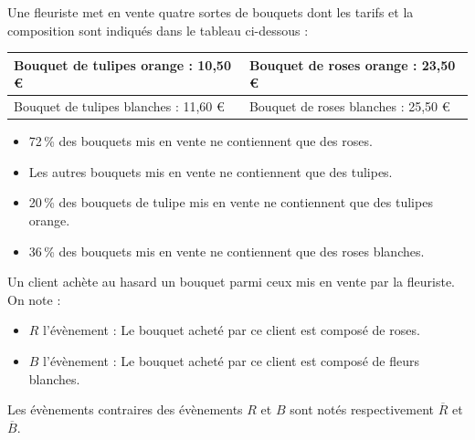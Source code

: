 \medskip

Une fleuriste met en vente quatre sortes de bouquets dont les tarifs et la composition sont
indiqués dans le tableau ci-dessous :

\medskip
\begin{center}
\begin{tabularx}{0.85\linewidth}{|*{2}{X|}}\hline
Bouquet de tulipes orange : 10,50 \euro  & Bouquet de roses orange : 23,50 \euro\\\hline
Bouquet de tulipes blanches : 11,60 \euro& Bouquet de roses blanches : 25,50 \euro\\\hline
\end{tabularx}
\end{center}
\medskip

\begin{itemize}
\item 72\,\% des bouquets mis en vente ne contiennent que des roses.
\item Les autres bouquets mis en vente ne contiennent que des tulipes.
\item 20\,\% des bouquets de tulipe mis en vente ne contiennent que des tulipes orange.
\item 36\,\% des bouquets mis en vente ne contiennent que des roses blanches.
\end{itemize}
Un client achète au hasard un bouquet parmi ceux mis en vente par la fleuriste. On note :

\begin{itemize}
\item $R$ l'évènement : \og Le bouquet acheté par ce client est composé de roses.\fg
\item $B$ l'évènement : \og Le bouquet acheté par ce client est composé de fleurs blanches. \fg
\end{itemize}
Les évènements contraires des évènements $R$ et $B$ sont notés respectivement $\overline{R}$ et $\overline{B}$.

\medskip

